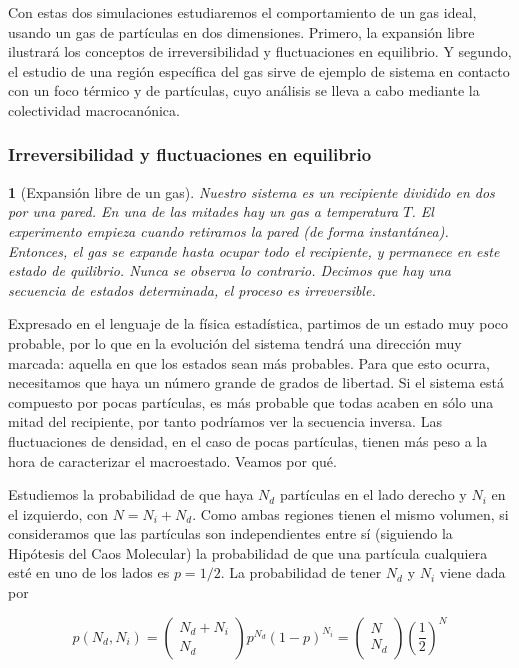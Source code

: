 \documentclass[11pt, a4paper]{article} %
\theoremstyle{named}
\newtheorem*{namedtheorem}{}
\begin{document}
Con estas dos simulaciones estudiaremos el comportamiento de un gas ideal, usando un gas de partículas en dos dimensiones. Primero, la expansión libre ilustrará los conceptos de irreversibilidad y fluctuaciones en equilibrio. Y segundo, el estudio de una región específica del gas sirve de ejemplo de sistema en contacto con un foco térmico y de partículas, cuyo análisis se lleva a cabo mediante la colectividad macrocanónica.

\subsubsection{Irreversibilidad y fluctuaciones en equilibrio}\label{sec:equilibrio}

\begin{namedtheorem}[Expansión libre de un gas] Nuestro sistema es un recipiente dividido en dos por una pared. En una de las mitades hay un gas a temperatura $T$. El experimento empieza cuando retiramos la pared (de forma instantánea). Entonces, el gas se expande hasta ocupar todo el recipiente, y permanece en este estado de quilibrio. Nunca se observa lo contrario. Decimos que hay una secuencia de estados determinada, el proceso es irreversible.
\end{namedtheorem}

Expresado en el lenguaje de la física estadística, partimos de un estado muy poco probable, por lo que en la evolución del sistema tendrá una dirección muy marcada: aquella en que los estados sean más probables. Para que esto ocurra, necesitamos que haya un número grande de grados de libertad. Si el sistema está compuesto por pocas partículas, es más probable que todas acaben en sólo una mitad del recipiente, por tanto podríamos ver la secuencia inversa. Las fluctuaciones de densidad, en el caso de pocas partículas, tienen más peso a la hora de caracterizar el macroestado. Veamos por qué.

Estudiemos la probabilidad de que haya $N_d$ partículas en el lado derecho y $N_i$ en el izquierdo, con $N = N_i + N_d$. Como ambas regiones tienen el mismo volumen, si consideramos que las partículas son independientes entre sí (siguiendo la Hipótesis del Caos Molecular) la probabilidad de que una partícula cualquiera esté en uno de los lados es $p={1/2}$. La probabilidad de tener $N_d$ y $N_i$ viene dada por

\begin{equation}\label{eq:gasBinom}
p\left(N_{d}, N_{i}\right)=\left(\begin{array}{c}
{N_{d}+N_{i}} \\
{N_{d}}
\end{array}\right) p^{N_{d}}(1-p)^{N_{i}}=\left(\begin{array}{c}
{N} \\
{N_{d}}
\end{array}\right)\left(\frac{1}{2}\right)^{N}
\end{equation}
\end{document}
